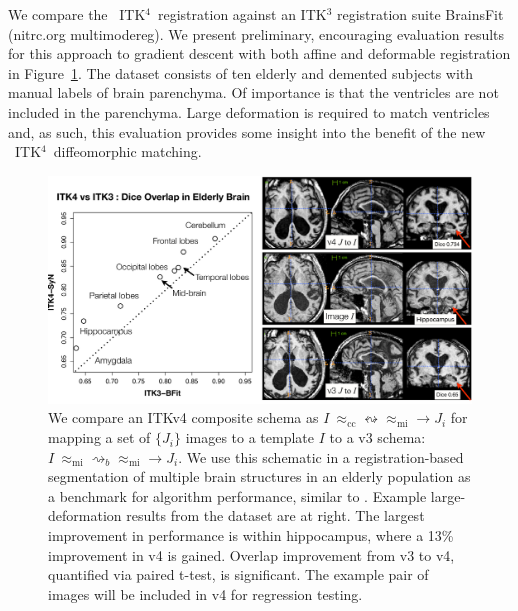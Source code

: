 \documentclass{frontiersSCNS}
\newcommand{\tk}{~ITK$^{\text{4}}$~}
\begin{document}
We compare the \tk registration against an ITK$^3$ registration suite
BrainsFit (nitrc.org multimodereg).  
We present preliminary, encouraging evaluation results for this approach to
gradient descent with both affine and deformable registration in Figure~\ref{fig:eval}.
The dataset consists of ten elderly and demented subjects with manual labels of brain
parenchyma.  Of importance is that the ventricles are not included in
the parenchyma.  Large deformation is required to match ventricles
and, as such, this evaluation provides some insight into the benefit
of the new \tk diffeomorphic matching.
\begin{figure}[t]
\begin{center}
\includegraphics[width=4.5in]{figs/eval.pdf}
\caption{We compare an ITKv4 composite schema as $I
~\approx_\text{cc}  \leftrightsquigarrow \approx_\text{mi}  \rightarrow
J_i $ for mapping a set of $\{ J_i \}$ images
to a template $I$ to a v3 schema:  $I
~\approx_\text{mi} \rightsquigarrow_b    \approx_\text{mi}  \rightarrow
J_i $.  We use this schematic in a registration-based
segmentation of multiple brain structures in an elderly population as a benchmark
for algorithm performance, similar to \cite{Klein2010}.  Example
large-deformation results from the dataset are at right.  The largest
improvement in performance is within hippocampus, where a 13\%
improvement in v4 is gained.  Overlap improvement from v3 to v4, quantified via
paired t-test, is significant.  The example pair of images will be
included in v4 for regression testing.}
\label{fig:eval}
\end{center}
\end{figure}
\end{document}
